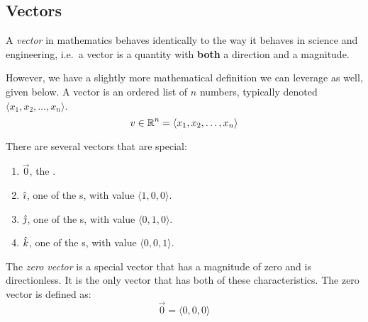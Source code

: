 \subsection{Vectors}\label{subsec:Vectors}
\begin{definition}[Vector]\label{def:Vector}
  A \emph{vector} in mathematics behaves identically to the way it behaves in science and engineering, i.e.\ a vector is a quantity with \textbf{both} a direction and a magnitude.

  However, we have a slightly more mathematical definition we can leverage as well, given below.
  A vector is an ordered list of $n$ numbers, typically denoted $\langle x_{1}, x_{2}, \ldots, x_{n} \rangle$.
  \begin{equation}\label{eq:Vector}
    v \in \operatorname{\mathbb{R}}^{n} = \langle x_{1}, x_{2}, \ldots, x_{n} \rangle
  \end{equation}
\end{definition}

There are several vectors that are special:
\begin{enumerate}[noitemsep]
\item $\vec{0}$, the .
\item $\hat{\imath}$, one of the s, with value $\langle 1, 0, 0 \rangle$.
\item $\hat{\jmath}$, one of the s, with value $\langle 0, 1, 0 \rangle$.
\item $\hat{k}$, one of the s, with value $\langle 0, 0, 1 \rangle$.
\end{enumerate}

\begin{definition}\label{def:Zero_Vector}
  The \emph{zero vector} is a special vector that has a magnitude of zero and is directionless.
  It is the only vector that has both of these characteristics.
  The zero vector is defined as:
  \begin{equation}\label{eq:Zero_Vector}
    \vec{0} = \langle 0, 0, 0 \rangle
  \end{equation}
\end{definition}

